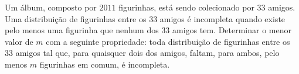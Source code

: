 Um álbum, composto por $2011$ figurinhas, está sendo colecionado por $33$ amigos.
Uma distribuição de figurinhas entre os $33$ amigos é incompleta quando existe pelo menos uma figurinha que nenhum dos $33$ amigos tem.
Determinar o menor valor de $m$ com a seguinte propriedade:
toda distribuição de figurinhas entre os $33$ amigos tal que, para quaisquer dois dos amigos, faltam, para ambos, pelo menos $m$ figurinhas em comum, é incompleta.